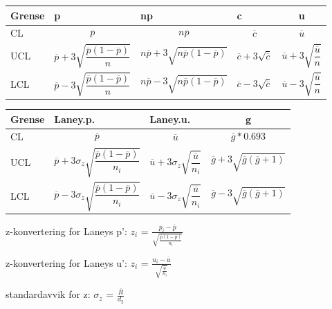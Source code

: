 \documentclass[
]{book}
\begin{document}
\begin{table}[!h]
\centering
\begin{tabular}{>{\centering\arraybackslash}p{3cm}|>{\centering\arraybackslash}p{5cm}|>{\centering\arraybackslash}p{5cm}|>{\centering\arraybackslash}p{5cm}|c}
\hline
Grense & p & np & c & u\\
\hline
CL & $$\overline{p}$$ & $$n\overline{p}$$ & $$\overline{c}$$ & $$\overline{u}$$\\
\hline
UCL & $$\overline{p} + 3\sqrt{\frac{\overline{p}(1-\overline{p})}{n}}$$ & $$n\overline{p} + 3\sqrt{n\overline{p}(1-\overline{p})}$$ & $$\overline{c} + 3\sqrt{\overline{c}}$$ & $$\overline{u} + 3\sqrt{\frac{\overline{u}}{n}}$$\\
\hline
LCL & $$\overline{p} - 3\sqrt{\frac{\overline{p}(1-\overline{p})}{n}}$$ & $$n\overline{p} - 3\sqrt{n\overline{p}(1-\overline{p})}$$ & $$\overline{c} - 3\sqrt{\overline{c}}$$ & $$\overline{u} - 3\sqrt{\frac{\overline{u}}{n}}$$\\
\hline
\end{tabular}
\end{table}

\begin{table}[!h]
\centering
\begin{tabular}{>{\centering\arraybackslash}p{3cm}|>{\centering\arraybackslash}p{5cm}|>{\centering\arraybackslash}p{5cm}|c}
\hline
Grense & Laney.p. & Laney.u. & g\\
\hline
CL & $$\overline{p}$$ & $$\overline{u}$$ & $$\overline{g}*0.693$$\\
\hline
UCL & $$\overline{p} + 3\sigma_z\sqrt{\frac{\overline{p}(1-\overline{p})}{n_i}}$$ & $$\overline{u} + 3\sigma_z\sqrt{\frac{\overline{u}}{n_i}}$$ & $$\overline{g} + 3\sqrt{\overline{g}(\overline{g}+1)}$$\\
\hline
LCL & $$\overline{p} - 3\sigma_z\sqrt{\frac{\overline{p}(1-\overline{p})}{n_i}}$$ & $$\overline{u} - 3\sigma_z\sqrt{\frac{\overline{u}}{n_i}}$$ & $$\overline{g} - 3\sqrt{\overline{g}(\overline{g}+1)}$$\\
\hline
\end{tabular}
\end{table}

z-konvertering for Laneys p': \(z_i\) = \(\frac{p_i-\overline{p}}{\sqrt{\frac{\overline{p}(1-\overline{p})}{n_i}}}\)

z-konvertering for Laneys u': \(z_i\) = \(\frac{u_i-\overline{u}}{\sqrt{\frac{\overline{u}}{n_i}}}\)

standardavvik for z: \(\sigma_z\) = \(\frac{\overline{R}}{d_2}\)
\end{document}
